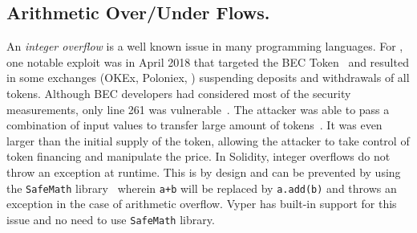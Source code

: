 \subsection{Arithmetic Over/Under Flows.}\label{subsec:ovf}
An \textit{integer overflow} is a well known issue in many programming languages. For \erc, one notable exploit was in April 2018 that targeted the BEC Token~\cite{BECToken} and resulted in some exchanges (\eg OKEx, Poloniex, \etc) suspending deposits and withdrawals of all tokens. Although BEC developers had considered most of the security measurements, only line 261 was vulnerable~\cite{Osiris,PeckShield}. The attacker was able to pass a combination of input values to transfer large amount of tokens~\cite{Overflow}. It was even larger than the initial supply of the token, allowing the attacker to take control of token financing and manipulate the price. In Solidity, integer overflows do not throw an exception at runtime. This is by design and can be prevented by using the \texttt{SafeMath} library~\cite{SafeMath} wherein \texttt{a+b} will be replaced by \texttt{a.add(b)} and throws an exception in the case of arithmetic overflow. Vyper has built-in support for this issue and no need to use \texttt{SafeMath} library.

